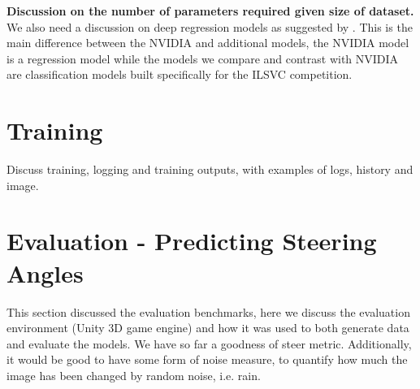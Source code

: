 


\textbf{Discussion on the number of parameters required given size of dataset.}  
We also need a discussion on deep regression models as suggested by \cite{lathuilire2018comprehensive}. This is the main difference between the NVIDIA and additional models, the NVIDIA model is a regression model while the models we compare and contrast with NVIDIA are classification models built specifically for the ILSVC  competition.

\section{Training}
Discuss training, logging and training outputs, with examples of logs, history and image.


\section{Evaluation - Predicting Steering Angles}
This section discussed the evaluation benchmarks, here we discuss the evaluation environment (Unity 3D game engine) and how it was used to both generate data and evaluate the models.
We have so far a goodness of steer metric. Additionally, it would be good to have some form of noise measure, to quantify how much the image has been changed by random noise, i.e. rain.




